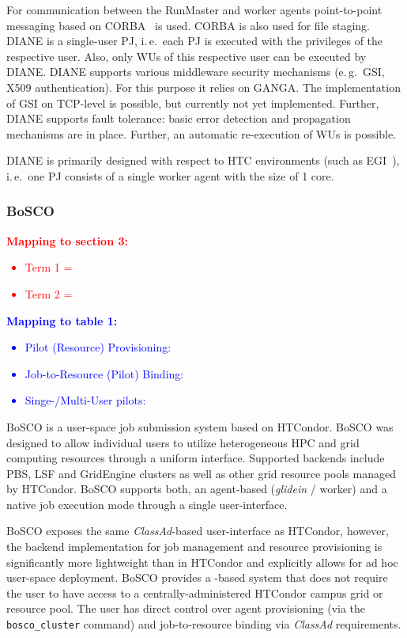 \documentclass{sig-alternate}
\begin{document}
For communication between the RunMaster and
worker agents point-to-point messaging based on CORBA~\cite{OMG-CORBA303:2004}
is used. CORBA is also used for file staging.
DIANE is a single-user PJ, i.\,e.\ each PJ is executed with the
privileges of the respective user. Also, only WUs of this respective user can be
executed by DIANE. DIANE supports various middleware security mechanisms
(e.\,g.\ GSI, X509 authentication). For this purpose it relies on GANGA. The
implementation of GSI on TCP-level is possible, but currently not yet
implemented. Further, DIANE supports fault tolerance: basic error detection and
propagation mechanisms are in place. Further, an automatic re-execution of WUs
is possible.

DIANE is primarily designed with respect to HTC environments (such as
EGI~\cite{egi}), i.\,e.\ one PJ consists of a single worker agent with the
size of 1 core.

%
\subsubsection{BoSCO}

\textcolor{red}
{
\textbf{Mapping to section 3:}
\begin{itemize}
\item Term 1 =
\item Term 2 =
\end{itemize}
}

\textcolor{blue}
{
\textbf{Mapping to table 1:}
\begin{itemize}
\item Pilot (Resource) Provisioning:
\item Job-to-Resource (Pilot) Binding:
\item Singe-/Multi-User pilots:
\end{itemize}
}

BoSCO is a user-space job submission system based on HTCondor. BoSCO was
designed to allow individual users to utilize heterogeneous HPC and grid
computing resources through a uniform interface. Supported backends include PBS,
LSF and GridEngine clusters as well as other  grid resource pools managed by
HTCondor. BoSCO supports both, an agent-based (\textit{glidein} / worker) and
a native job execution mode through a single user-interface.

BoSCO exposes the same \textit{ClassAd}-based user-interface as HTCondor,
however, the backend implementation for job management and resource provisioning
is significantly more lightweight than in HTCondor and explicitly allows for ad
hoc user-space deployment. BoSCO provides a \pilotjob-based system that does not
require the user to have access to a centrally-administered HTCondor campus grid
or  resource pool. The user has direct control over \pilotjob agent provisioning
(via the \texttt{bosco\_cluster} command) and job-to-resource binding via
\textit{ClassAd} requirements. 
\end{document}
